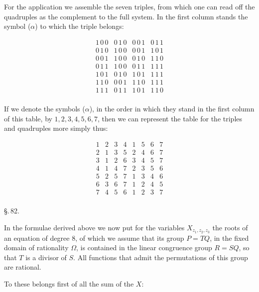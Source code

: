 
For the application we assemble the seven triples, from which one can read off the quadruples as the complement to the full system. In the first column stands the symbol ($\alpha$) to which the triple belongs:

\[
\begin{array}{c||ccc|}
1\,0\,0 & 0\,1\,0 & 0\,0\,1 & 0\,1\,1 \\
0\,1\,0 & 1\,0\,0 & 0\,0\,1 & 1\,0\,1 \\
0\,0\,1 & 1\,0\,0 & 0\,1\,0 & 1\,1\,0 \\
0\,1\,1 & 1\,0\,0 & 0\,1\,1 & 1\,1\,1 \\
1\,0\,1 & 0\,1\,0 & 1\,0\,1 & 1\,1\,1 \\
1\,1\,0 & 0\,0\,1 & 1\,1\,0 & 1\,1\,1 \\
1\,1\,1 & 0\,1\,1 & 1\,0\,1 & 1\,1\,0 \\
\end{array}
\]

If we denote the symbols ($\alpha$), in the order in which they stand in the first column of this table, by $1, 2, 3, 4, 5, 6, 7$, then we can represent the table for the triples and quadruples more simply thus:

\[
\begin{array}{c|ccc|cccc}
1 & 2 & 3 & 4 & 1 & 5 & 6 & 7 \\
2 & 1 & 3 & 5 & 2 & 4 & 6 & 7 \\
3 & 1 & 2 & 6 & 3 & 4 & 5 & 7 \\
4 & 1 & 4 & 7 & 2 & 3 & 5 & 6 \\
5 & 2 & 5 & 7 & 1 & 3 & 4 & 6 \\
6 & 3 & 6 & 7 & 1 & 2 & 4 & 5 \\
7 & 4 & 5 & 6 & 1 & 2 & 3 & 7 \\
\end{array}
\]

\begin{center}
\S.\,82.

\end{center}

In the formulae derived above we now put for the variables $X_{z_1,z_2,z_3}$ the roots of an equation of degree $8$, of which we assume that its  group $P = TQ$, in the fixed domain of rationality $\Omega$, is contained in the linear congruence group $R = SQ$, so that $T$ is a divisor of $S$. All functions that admit the permutations of this group are rational.

To these belongs first of all the sum of the $X$:


